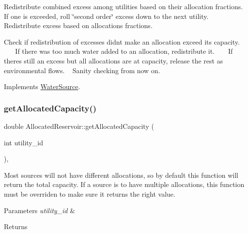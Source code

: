 Redistribute combined excess among utilities based on their allocation fractions. If one is exceeded, roll \char`\"{}second order\char`\"{} excess down to the next utility. ~\newline
~\newline
~\newline
~\newline
~\newline
 Redistribute excess based on allocations fractions.

Check if redistribution of excesses didn\textquotesingle{}t make an allocation exceed its capacity. ~\newline
~\newline
~\newline
 If there was too much water added to an allocation, redistribute it. ~\newline
~\newline
 If there\textquotesingle{}s still an excess but all allocations are at capacity, release the rest as environmental flows. ~\newline
 Sanity checking from now on. 

Implements \mbox{\hyperlink{classWaterSource_ac070445379fe706f65b977dade4f3fbc_ac070445379fe706f65b977dade4f3fbc}{Water\+Source}}.

\mbox{\label{classAllocatedReservoir_a8b9b38494fa23f0bea78134c82644bf1_a8b9b38494fa23f0bea78134c82644bf1}} 
\subsubsection{\texorpdfstring{get\+Allocated\+Capacity()}{getAllocatedCapacity()}}
{\footnotesize\ttfamily double Allocated\+Reservoir\+::get\+Allocated\+Capacity (\begin{DoxyParamCaption}\item[{int}]{utility\+\_\+id }\end{DoxyParamCaption})\hspace{0.3cm}{\ttfamily [override]}, {\ttfamily [virtual]}}

Most sources will not have different allocations, so by default this function will return the total capacity. If a source is to have multiple allocations, this function must be overriden to make sure it returns the right value. 
\begin{DoxyParams}{Parameters}
{\em utility\+\_\+id} & \\
\hline
\end{DoxyParams}
\begin{DoxyReturn}{Returns}

\end{DoxyReturn}


